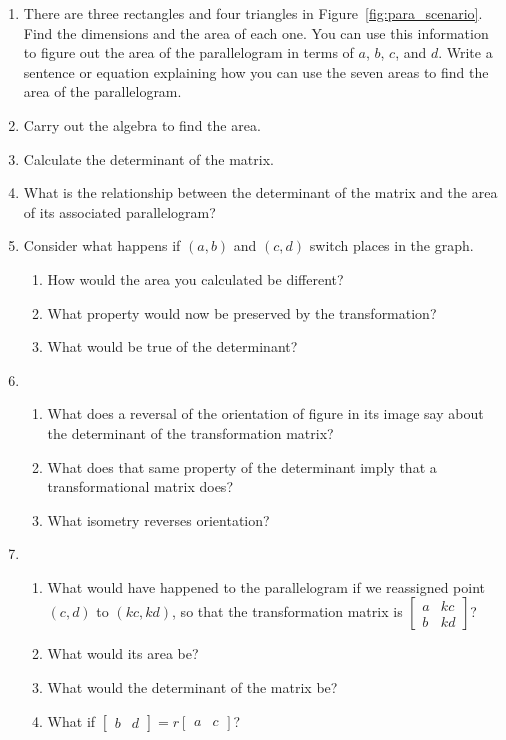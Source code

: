\documentclass[../gatm.tex]{subfiles}
\begin{document}
\begin{enumerate}
\begin{enumerate}
\item There are three rectangles and four triangles in Figure~\ref{fig:para_scenario}. Find the dimensions and the area of each one. You can use this information to figure out the area of the parallelogram in terms of $a$, $b$, $c$, and $d$. Write a sentence or equation explaining how you can use the seven areas to find the area of the parallelogram.
\item Carry out the algebra to find the area.
\item Calculate the determinant of the matrix.
\item What is the relationship between the determinant of the matrix and the area of its associated parallelogram?
\item Consider what happens if $(a,b)$ and $(c,d)$ switch places in the graph.
\begin{enumerate}
\item How would the area you calculated be different?
\item What property would now be preserved by the transformation?
\item What would be true of the determinant?
\end{enumerate}
\item \begin{enumerate}
\item What does a reversal of the orientation of figure in its image say about the determinant of the transformation matrix?
\item What does that same property of the determinant imply that a transformational matrix does?
\item What isometry reverses orientation?
\end{enumerate}
\item \begin{enumerate}
\item What would have happened to the parallelogram if we reassigned point $(c,d)$ to $(kc,kd)$, so that the transformation matrix is $\left[\begin{smallmatrix} a & kc \\ b & kd \end{smallmatrix}\right]$?
\item What would its area be?
\item What would the determinant of the matrix be?
\item What if $\left[\begin{smallmatrix}b & d \end{smallmatrix}\right]=r\left[\begin{smallmatrix}a & c \end{smallmatrix}\right]$?
\end{enumerate}
\end{enumerate}
\setcounter{problem_i}{\value{enumi}}
\end{enumerate}
\end{document}
